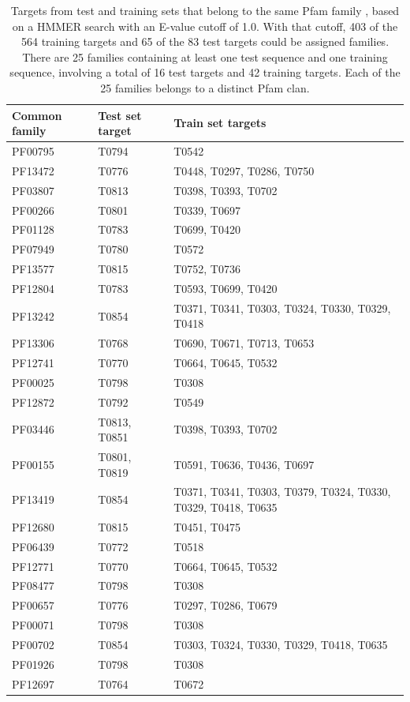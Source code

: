 \documentclass[letter,10pt]{article}
\begin{document}
\begin{table}[H]
\begin{center}
\begin{tabular}{ l | l | l }

    Common family & Test set target & Train set targets \\
    \hline
    PF00795 & T0794 & T0542 \\ \hline
    PF13472 & T0776 & T0448, T0297, T0286, T0750 \\ \hline
    PF03807 & T0813 & T0398, T0393, T0702 \\ \hline
    PF00266 & T0801 & T0339, T0697 \\ \hline
    PF01128 & T0783 & T0699, T0420 \\ \hline
    PF07949 & T0780 & T0572 \\ \hline
    PF13577 & T0815 & T0752, T0736 \\ \hline
    PF12804 & T0783 & T0593, T0699, T0420 \\ \hline
    PF13242 & T0854 & T0371, T0341, T0303, T0324, T0330, T0329, T0418 \\ \hline
    PF13306 & T0768 & T0690, T0671, T0713, T0653 \\ \hline
    PF12741 & T0770 & T0664, T0645, T0532 \\ \hline
    PF00025 & T0798 & T0308 \\ \hline
    PF12872 & T0792 & T0549 \\ \hline
    PF03446 & T0813, T0851 & T0398, T0393, T0702 \\ \hline
    PF00155 & T0801, T0819 & T0591, T0636, T0436, T0697 \\ \hline
    PF13419 & T0854 & T0371, T0341, T0303, T0379, T0324, T0330, T0329, T0418, T0635 \\ \hline
    PF12680 & T0815 & T0451, T0475 \\ \hline
    PF06439 & T0772 & T0518 \\ \hline
    PF12771 & T0770 & T0664, T0645, T0532 \\ \hline
    PF08477 & T0798 & T0308 \\ \hline
    PF00657 & T0776 & T0297, T0286, T0679 \\ \hline
    PF00071 & T0798 & T0308 \\ \hline
    PF00702 & T0854 & T0303, T0324, T0330, T0329, T0418, T0635 \\ \hline
    PF01926 & T0798 & T0308 \\ \hline
    PF12697 & T0764 & T0672 \\ \hline
\end{tabular}
   
\caption{Targets from test and training sets that belong to the same Pfam
family \cite{finn2016pfam}, based on a HMMER search \cite{finn2015hmmer} with an
E-value cutoff of 1.0. With that cutoff, 403 of the 564 training
targets and 65 of the 83 test targets could be assigned
families. There are 25 families containing at least one test sequence
and one training sequence, involving a total of 16 test targets and 42
training targets. Each of the 25 families belongs to a distinct Pfam
clan.}
%
\label{Tbl:SharedPfam}
\end{center}
\end{table}
\end{document}
